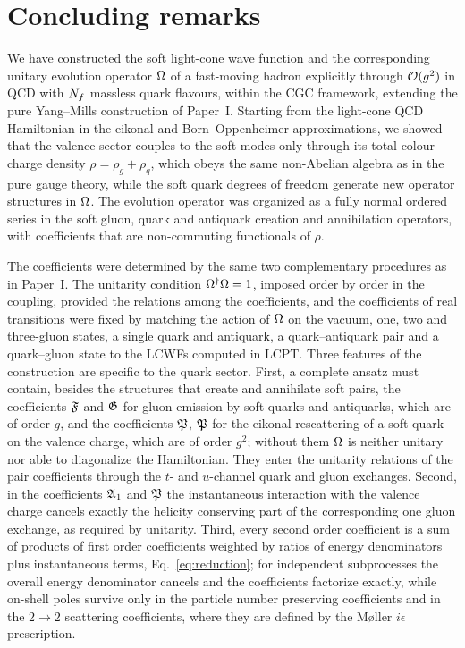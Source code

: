 \section{Concluding remarks}
\label{sec:concl}

We have constructed the soft light-cone wave function and the corresponding unitary evolution
operator $\Omega$ of a fast-moving hadron explicitly through $\mathcal{O}(g^{2})$ in QCD with $N_{f}$ massless
quark flavours, within the CGC framework, extending the pure Yang--Mills construction of Paper~I.
Starting from the light-cone QCD Hamiltonian in the eikonal and Born--Oppenheimer approximations,
we showed that the valence sector couples to the soft modes only through its total colour charge
density $\rho=\rho_{g}+\rho_{q}$, which obeys the same non-Abelian algebra as in the pure gauge theory,
while the soft quark degrees of freedom generate new operator structures in $\Omega$. The evolution
operator was organized as a fully normal ordered series in the soft gluon, quark and antiquark
creation and annihilation operators, with coefficients that are non-commuting functionals of $\rho$.

The coefficients were determined by the same two complementary procedures as in Paper~I. The
unitarity condition $\Omega^{\dagger}\Omega=1$, imposed order by order in the coupling, provided the relations
among the coefficients, and the coefficients of real transitions were fixed by matching the action of
$\Omega$ on the vacuum, one, two and three-gluon states, a single quark and antiquark, a quark--antiquark
pair and a quark--gluon state to the LCWFs computed in LCPT. Three features of the construction are
specific to the quark sector. First, a complete ansatz must contain, besides the structures that
create and annihilate soft pairs, the coefficients $\mathfrak{F}$ and $\mathfrak{G}$ for gluon emission by soft quarks
and antiquarks, which are of order $g$, and the coefficients $\mathfrak{P}$, $\bar{\mathfrak{P}}$ for the eikonal
rescattering of a soft quark on the valence charge, which are of order $g^{2}$; without them $\Omega$ is
neither unitary nor able to diagonalize the Hamiltonian. They enter the unitarity relations of the
pair coefficients through the $t$- and $u$-channel quark and gluon exchanges. Second, in the
coefficients $\mathfrak{A}_{1}$ and $\mathfrak{P}$ the instantaneous interaction with the valence charge cancels
exactly the helicity conserving part of the corresponding one gluon exchange, as required by
unitarity. Third, every second order coefficient is a sum of products of first order coefficients
weighted by ratios of energy denominators plus instantaneous terms, Eq.~\eqref{eq:reduction}; for
independent subprocesses the overall energy denominator cancels and the coefficients factorize
exactly, while on-shell poles survive only in the particle number preserving coefficients and in the
$2\to2$ scattering coefficients, where they are defined by the M{\o}ller $i\epsilon$ prescription.

